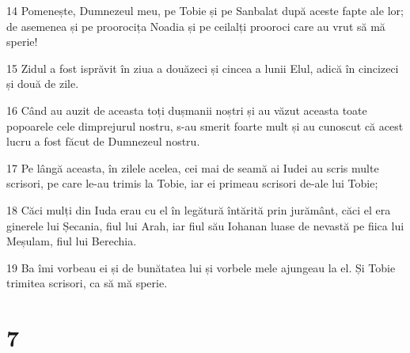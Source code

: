 \par 14 Pomenește, Dumnezeul meu, pe Tobie și pe Sanbalat după aceste fapte ale lor; de asemenea și pe proorocița Noadia și pe ceilalți prooroci care au vrut să mă sperie!
\par 15 Zidul a fost isprăvit în ziua a douăzeci și cincea a lunii Elul, adică în cincizeci și două de zile.
\par 16 Când au auzit de aceasta toți dușmanii noștri și au văzut aceasta toate popoarele cele dimprejurul nostru, s-au smerit foarte mult și au cunoscut că acest lucru a fost făcut de Dumnezeul nostru.
\par 17 Pe lângă aceasta, în zilele acelea, cei mai de seamă ai Iudei au scris multe scrisori, pe care le-au trimis la Tobie, iar ei primeau scrisori de-ale lui Tobie;
\par 18 Căci mulți din Iuda erau cu el în legătură întărită prin jurământ, căci el era ginerele lui Șecania, fiul lui Arah, iar fiul său Iohanan luase de nevastă pe fiica lui Meșulam, fiul lui Berechia.
\par 19 Ba îmi vorbeau ei și de bunătatea lui și vorbele mele ajungeau la el. Și Tobie trimitea scrisori, ca să mă sperie.

\chapter{7}

